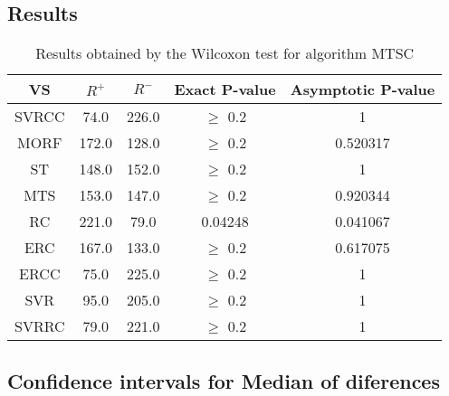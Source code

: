 \documentclass[a4paper,10pt]{article}
\begin{document}
\subsection{Results}

\begin{table}[!htp]
\centering\small
\begin{tabular}{
|c|c|c|c|c|}
\hline
 VS & $R^{+}$ & $R^{-}$ & Exact P-value & Asymptotic P-value \\ \hline 
SVRCC & 74.0 & 226.0 & $\geq$ 0.2 & 1\\ \hline 
MORF & 172.0 & 128.0 & $\geq$ 0.2 & 0.520317\\ \hline 
ST & 148.0 & 152.0 & $\geq$ 0.2 & 1\\ \hline 
MTS & 153.0 & 147.0 & $\geq$ 0.2 & 0.920344\\ \hline 
RC & 221.0 & 79.0 & 0.04248 & 0.041067\\ \hline 
ERC & 167.0 & 133.0 & $\geq$ 0.2 & 0.617075\\ \hline 
ERCC & 75.0 & 225.0 & $\geq$ 0.2 & 1\\ \hline 
SVR & 95.0 & 205.0 & $\geq$ 0.2 & 1\\ \hline 
SVRRC & 79.0 & 221.0 & $\geq$ 0.2 & 1\\ \hline 

\end{tabular}
\caption{Results obtained by the Wilcoxon test for algorithm MTSC}
\end{table}

\subsection{Confidence intervals for Median of diferences}
\end{document}
